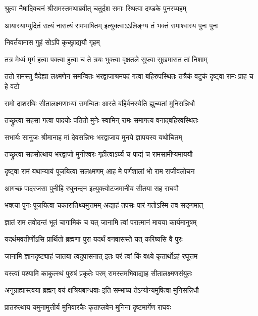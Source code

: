 \twolineshloka
{श्रुत्वा नैषादिवचनं श्रीरामस्तमथाब्रवीत्}
{चतुर्दश समाः स्थित्वा दण्डके पुनरप्यहम्} %

\twolineshloka
{आयास्याम्युदितं सत्यं नासत्यं रामभाषितम्}
{इत्युक्त्वाऽऽलिङ्ग्य तं भक्तं समाश्वास्य पुनः पुनः} %

\onelineshloka
{निवर्तयामास गुहं सोऽपि कृच्छ्राद्ययौ गृहम्} %

\twolineshloka
{तत्र मेध्यं मृगं हत्वा पक्त्वा हुत्वा च ते त्रयः}
{भुक्त्वा वृक्षतले सुप्त्वा सुखमासत तां निशाम्} %

\threelineshloka
{ततो रामस्तु वैदेह्या लक्ष्मणेन समन्वितः}
{भरद्वाजाश्रमपदं गत्वा बहिरुपस्थितः}
{तत्रैकं वटुकं दृष्ट्वा रामः प्राह च हे वटो} %

\twolineshloka
{रामो दाशरथिः सीतालक्ष्मणाभ्यां समन्वितः}
{आस्ते बहिर्वनस्येति ह्युच्यतां मुनिसन्निधौ} %

\twolineshloka
{तच्छ्रुत्वा सहसा गत्वा पादयोः पतितो मुनेः}
{स्वामिन् रामः समागत्य वनाद्बहिरवस्थितः} %

\twolineshloka
{सभार्यः सानुजः श्रीमानाह मां देवसन्निभः}
{भरद्वाजाय मुनये ज्ञापयस्व यथोचितम्} %

\twolineshloka
{तच्छ्रुत्वा सहसोत्थाय भरद्वाजो मुनीश्वरः}
{गृहीत्वाऽर्घ्यं च पाद्यं च रामसामीप्यमाययौ} %

\twolineshloka
{दृष्ट्वा रामं यथान्यायं पूजयित्वा सलक्ष्मणम्}
{आह मे पर्णशालां भो राम राजीवलोचन} %

\twolineshloka
{आगच्छ पादरजसा पुनीहि रघुनन्दन}
{इत्युक्त्वोटजमानीय सीतया सह राघवौ} %

\twolineshloka
{भक्त्या पुनः पूजयित्वा चकारातिथ्यमुत्तमम्}
{अद्याहं तपसः पारं गतोऽस्मि तव सङ्गमात्} %

\twolineshloka
{ज्ञातं राम तवोदन्तं भूतं चागामिकं च यत्}
{जानामि त्वां परात्मानं मायया कार्यमानुषम्} %

\twolineshloka
{यदर्थमवतीर्णोऽसि प्रार्थितो ब्रह्मणा पुरा}
{यदर्थं वनवासस्ते यत् करिष्यसि वै पुरः} %

\twolineshloka
{जानामि ज्ञानदृष्ट्याहं जातया त्वदुपासनात्}
{इतः परं त्वां किं वक्ष्ये कृतार्थोऽहं रघूत्तम} %

\twolineshloka
{यस्त्वां पश्यामि काकुत्स्थं पुरुषं प्रकृतेः परम्}
{रामस्तमभिवाद्याह सीतालक्ष्मणसंयुतः} %

\twolineshloka
{अनुग्राह्यास्त्वया ब्रह्मन् वयं क्षत्रियबान्धवाः}
{इति सम्भाष्य तेऽन्योन्यमुषित्वा मुनिसन्निधौ} %

\twolineshloka
{प्रातरुत्थाय यमुनामुत्तीर्य मुनिवारकैः}
{कृताप्लवेन मुनिना दृष्टमार्गेण राघवः} %

